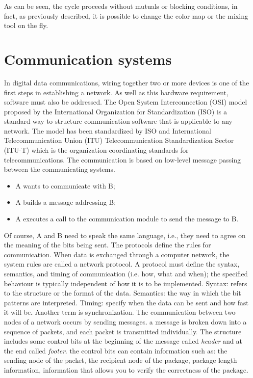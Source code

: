 As can be seen, the cycle proceeds without mutuals or blocking conditions, in
fact, as previously described, it is possible to change the color map or the
mixing tool on the fly.
%
\newpage
\section{Communication systems}
\label{sec:software-TCPSocket}
In digital data communications, wiring together two or more devices is one of
the first steps in establishing a network. As well as this hardware requirement,
software must also be addressed. The Open System Interconnection (OSI) model
proposed by the International Organization for Standardization (ISO) is a
standard way to structure communication software that is applicable to any
network. The model has been standardized by ISO and International
Telecommunication Union (ITU) Telecommunication Standardization Sector (ITU-T)
which is the organization coordinating standards for telecommunications. 
The
communication is based on low-level message passing between the communicating
systems.
\begin{itemize}
\item A wants to communicate with B; 
\item A builds a message addressing B; 
\item A executes a call to the communication module to send the message to B.
\end{itemize}
Of course, A and B need to speak the same language, i.e., they need to agree on the meaning
of the bits being sent. The protocols define the rules for communication. 
When
data is exchanged through a computer network, the system rules are called a
network protocol. A protocol must define the syntax, semantics, and timing of
communication (i.e. how, what and when); the specified behaviour is typically
independent of how it is to be implemented. Syntax: refers to the structure or
the format of the data. Semantics: the way in which the bit patterns are
interpreted. Timing: specify when the data can be sent and how fast it will be.
Another term is synchronization.
The communication between two nodes of a network occurs by sending messages. a
message is broken down into a sequence of packets, and each packet is
transmitted individually.
The structure includes some control bits at the beginning of the message called
\emph{header} and at the end called \emph{footer}.
the control bits can contain information such as: the sending node of the
packet, the recipient node of the package, package length information,
information that allows you to verify the correctness of the package. \cite{mandrioli2008informatica}
%
%
